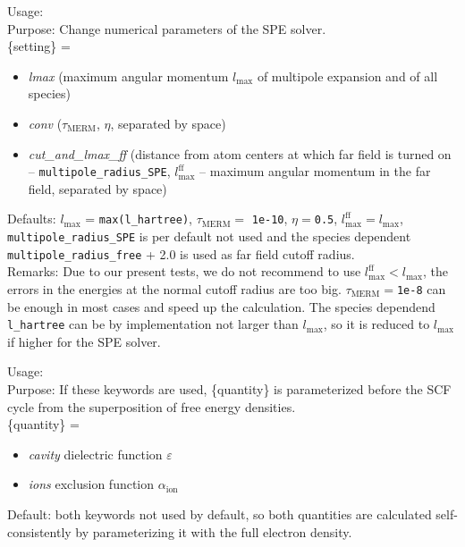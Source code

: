 {
  \noindent
  Usage:   \\[1.0ex]
  Purpose: Change numerical parameters of the SPE solver. \\[1.0ex]
   \{setting\} = 
  \begin{itemize}
  \item \textit{lmax} (maximum angular momentum $l_\mathrm{max}$ of multipole expansion and of all species)
  \item  \textit{conv} ($\tau_\mathrm{MERM}$, $\eta$, separated by space)
  \item  \textit{cut\_and\_lmax\_ff} (distance from atom centers at which far field is turned on -- \texttt{multipole\_radius\_SPE}, $l_\mathrm{max}^\mathrm{ff}$ -- maximum angular momentum in the far field, separated by space)
  \end{itemize}  
  Defaults: $l_\mathrm{max}$ = \texttt{max(l\_hartree)}, $\tau_\mathrm{MERM} =$ \texttt{1e-10}, $\eta = $\texttt{0.5}, ${l_\mathrm{max}^\mathrm{ff} = l_\mathrm{max}}$, \texttt{multipole\_radius\_SPE} is per default not used and the species dependent \texttt{multipole\_radius\_free} + 2.0 is used as far field cutoff radius. \\[1.0ex]
  Remarks: Due to our present tests, we do not recommend to use ${l_\mathrm{max}^\mathrm{ff} < l_\mathrm{max}}$, the errors in the energies at the normal cutoff radius are too big. $\tau_\mathrm{MERM} =$\texttt{1e-8} can be enough in most cases and speed up the calculation. The species dependend \texttt{l\_hartree} can be by implementation not larger than $l_\mathrm{max}$, so it is reduced to $l_\mathrm{max}$ if higher for the SPE solver. 
}

{
  \noindent
  Usage:  \\[1.0ex]
  Purpose: If these keywords are used, \{quantity\} is parameterized before the SCF cycle from the superposition of free energy densities. \\[1.0ex]
  \{quantity\} = 
  \begin{itemize}
    \item \textit{cavity} dielectric function $\varepsilon$
    \item \textit{ions} exclusion function $\alpha_\mathrm{ion}$
  \end{itemize}  
  Default: both keywords not used by default, so both quantities are calculated self-consistently by parameterizing it with the full electron density.
}

